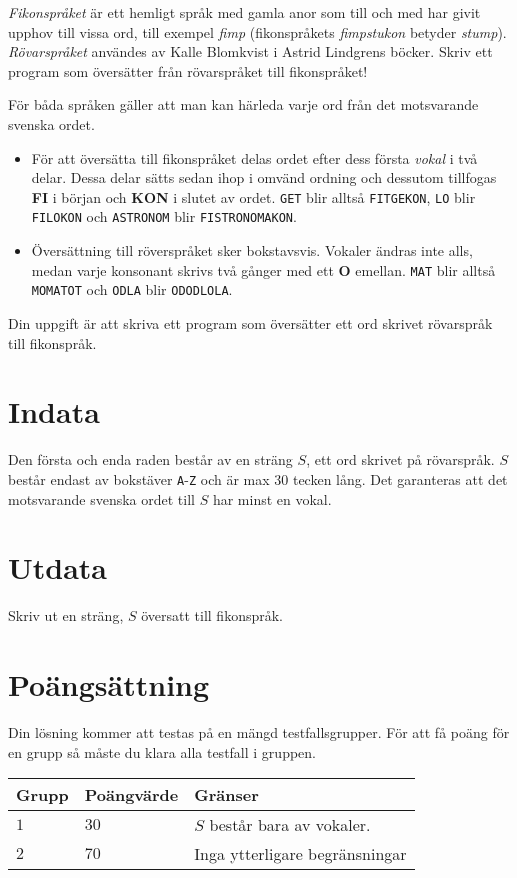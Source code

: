 \textit{Fikonspråket} är ett hemligt språk med gamla anor som till och med har givit upphov till vissa ord, till exempel \textit{fimp} (fikonspråkets \textit{fimpstukon} betyder \textit{stump}). \textit{Rövarspråket} användes av Kalle Blomkvist i Astrid Lindgrens böcker. Skriv ett program som översätter från rövarspråket till fikonspråket!

För båda språken gäller att man kan härleda varje ord från det motsvarande svenska ordet. 

\begin{itemize}
        \item För att översätta till fikonspråket delas ordet efter dess första \textit{vokal} i två delar. Dessa delar sätts sedan ihop i omvänd ordning och dessutom tillfogas \textbf{FI} i början och \textbf{KON} i slutet av ordet. \texttt{GET} blir alltså \texttt{FITGEKON}, \texttt{LO} blir \texttt{FILOKON} och \texttt{ASTRONOM} blir \texttt{FISTRONOMAKON}.
        \item Översättning till röverspråket sker bokstavsvis. Vokaler ändras inte alls, medan varje konsonant skrivs två gånger med ett \textbf{O} emellan. \texttt{MAT} blir alltså \texttt{MOMATOT} och \texttt{ODLA} blir \texttt{ODODLOLA}.
\end{itemize}


Din uppgift är att skriva ett program som översätter ett ord skrivet rövarspråk till fikonspråk.

\section*{Indata}
Den första och enda raden består av en sträng $S$, ett ord skrivet på rövarspråk. $S$ består endast av bokstäver \texttt{A}-\texttt{Z} och är max 30 tecken lång. Det garanteras att det motsvarande svenska ordet till $S$ har minst en vokal.

\section*{Utdata}
Skriv ut en sträng, $S$ översatt till fikonspråk.

\section*{Poängsättning}
Din lösning kommer att testas på en mängd testfallsgrupper. För att få poäng för en grupp så måste du klara alla testfall i gruppen.


\noindent
\begin{tabular}{| l | l | p{12cm} |}
  \hline
  Grupp & Poängvärde & Gränser \\ \hline
  $1$   & $30$       & $S$ består bara av vokaler. \\ \hline
  $2$   & $70$       & Inga ytterligare begränsningar \\ \hline
\end{tabular}
